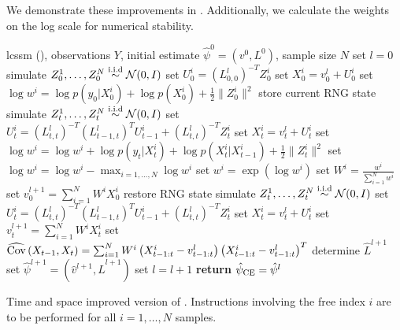 We demonstrate these improvements in . Additionally, we calculate the weights on the log scale for numerical stability.

\begin{algorithm}
    \begin{algorithmic}
        \Require \gls{lcssm} (), observations $Y$, initial estimate $\hat\psi^0 = \left( v^{0}, L^{0}\right)$, sample size $N$
        \State set $l = 0$
        \Repeat 
            \State simulate $Z^{1}_0, \dots, Z^{N}_0 \stackrel{\text{i.i.d}}{\sim} \mathcal N(0, I)$ 
            \State set $U^{i}_0 = (L^{l}_{0,0})^{-T}Z_{0}^{i}$ 
            \State set $X_{0}^{i} = v^{l}_{0} + U^{i}_0$ 
            \State set $\log w^{i} = \log p(y_{0}|X_{0}^{i}) + \log p(X_{0}^i) + \frac{1}{2} \lVert Z^{i}_0\rVert^{2}$ 
            \State store current RNG state
                \State simulate $Z^{1}_t, \dots, Z^{N}_t \stackrel{\text{i.i.d}}{\sim} \mathcal N(0, I)$ 
                \State set $U^{i}_t = (L^{l}_{t,t})^{-T}(L_{t - 1, t}^{l})^{T}U^{i}_{t - 1} + (L^{l}_{t,t})^{-T}Z_{t}^{i}$ 
                \State set $X_{t}^{i} = v^{l}_{t} + U^{i}_t$ 
                \State set $\log w^{i} = \log w^{i} + \log p(y_{t}|X_{t}^{i}) + \log p(X_{t}^i|X_{t - 1}^i) + \frac{1}{2} \lVert Z^{i}_t\rVert^{2}$ 
            \EndFor
            \State set $\log w^{i} = \log w^{i} - \max_{i = 1,\dots, N} \log w^{i}$ 
            \State set $w^{i} = \exp (\log w^{i})$
            \State set $W^{i} = \frac{w^{i}}{\sum_{i = 1}^N w^{i}}$ 
            \State set $v^{l + 1}_0 = \sum_{i = 1}^{N}W^{i}X_{0}^i$
            \State restore RNG state
                \State simulate $Z^{1}_t, \dots, Z^{N}_t \stackrel{\text{i.i.d}}{\sim} \mathcal N(0, I)$ 
                \State set $U^{i}_t = (L^{l}_{t,t})^{-T}(L^{l}_{t - 1, t})^{T}U^{i}_{t - 1} + (L^{l}_{t,t})^{-T}Z_{t}^{i}$ 
                \State set $X_{t}^{i} = v^{l}_{t} + U^{i}_t$ 
                \State set $v^{l + 1}_t = \sum_{i = 1}^{N} W^{i}X^{i}_t$
                \State set $\widehat{\operatorname{Cov}} \left( X_{t - 1}, X_{t} \right) = \sum_{i = 1}^N W^{i} \left( X^{i}_{t-1:t} - v^{l}_{t-1:t} \right)\left( X^{i}_{t-1:t} - v^{l}_{t-1:t} \right)^{T}$
            \EndFor
            \State determine $\hat L^{l + 1}$ 
            \State set $\hat\psi^{l + 1} = \left( \hat v^{l + 1}, \hat L^{l + 1}\right)$ 
            \State set $l = l + 1$
        \State \textbf{return} ${\hat\psi_{\text{CE}}} = \hat \psi^{l}$
        
    \end{algorithmic}
    \caption{Time and space improved version of . Instructions involving the free index $i$ are to be performed for all $i = 1, \dots, N$ samples.}
    \label{alg:cem-markov-proposal-fast}
\end{algorithm}

